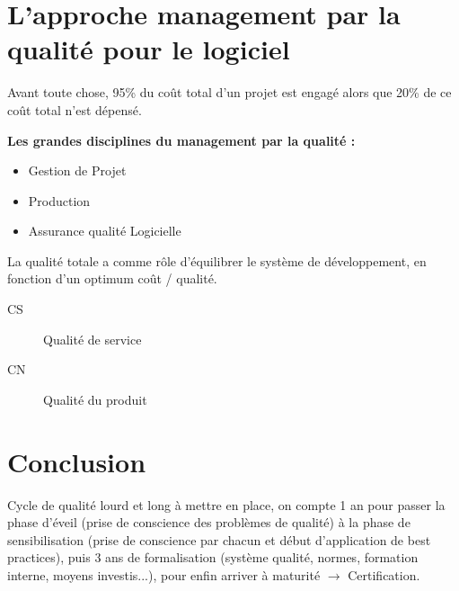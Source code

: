 \section{L’approche management par la qualité pour le logiciel}

Avant toute chose,  95\% du coût total d’un projet est engagé alors que 20\% de ce coût total n’est dépensé. %

\textbf{Les grandes disciplines du management par la qualité :}\hfill\\
\begin{itemize}
	\item Gestion de Projet
	\item Production
	\item Assurance qualité Logicielle
\end{itemize}

La qualité totale a comme rôle d’équilibrer le système de développement, en fonction d’un optimum coût / qualité.

\begin{description}
\item[CS] Qualité de service
\item[CN] Qualité du produit
\end{description}

\section{Conclusion}

Cycle de qualité lourd et long à mettre en place, on compte 1 an pour passer la phase d’éveil (prise de conscience des problèmes de qualité) à la phase de sensibilisation (prise de conscience par chacun et début d'application de best practices), puis 3 ans de formalisation (système qualité, normes, formation interne, moyens investis...), pour enfin arriver à maturité $\rightarrow$ Certification.

